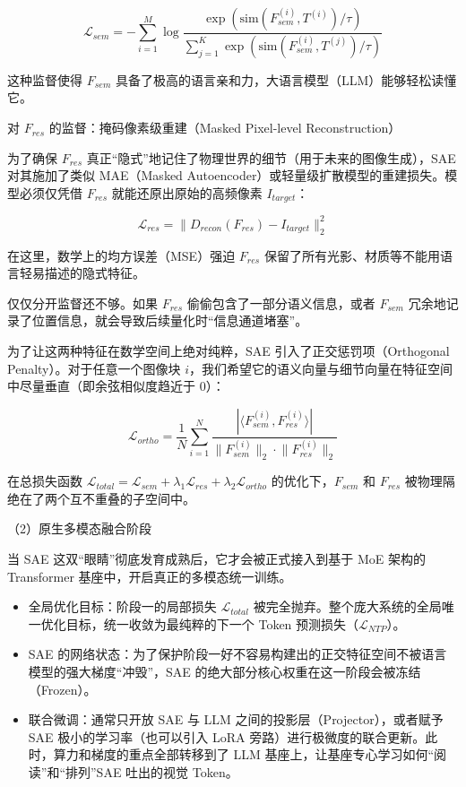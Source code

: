 \[
\mathcal{L}_{sem}=-\sum_{i=1}^{M}\log
\frac{\exp(\mathrm{sim}(F_{sem}^{(i)},T^{(i)})/\tau)}
{\sum_{j=1}^{K}\exp(\mathrm{sim}(F_{sem}^{(i)},T^{(j)})/\tau)}
\]

这种监督使得 \(F_{sem}\) 具备了极高的语言亲和力，大语言模型（LLM）能够轻松读懂它。

对 \(F_{res}\) 的监督：掩码像素级重建（Masked Pixel-level Reconstruction）

为了确保 \(F_{res}\) 真正``隐式''地记住了物理世界的细节（用于未来的图像生成），SAE 对其施加了类似 MAE（Masked Autoencoder）或轻量级扩散模型的重建损失。模型必须仅凭借 \(F_{res}\) 就能还原出原始的高频像素 \(I_{target}\)：

\[
\mathcal{L}_{res}=\lVert D_{recon}(F_{res})-I_{target}\rVert_2^2
\]

在这里，数学上的均方误差（MSE）强迫 \(F_{res}\) 保留了所有光影、材质等不能用语言轻易描述的隐式特征。

仅仅分开监督还不够。如果 \(F_{res}\) 偷偷包含了一部分语义信息，或者 \(F_{sem}\) 冗余地记录了位置信息，就会导致后续量化时``信息通道堵塞''。

为了让这两种特征在数学空间上绝对纯粹，SAE 引入了正交惩罚项（Orthogonal Penalty）。对于任意一个图像块 \(i\)，我们希望它的语义向量与细节向量在特征空间中尽量垂直（即余弦相似度趋近于 0）：

\[
\mathcal{L}_{ortho}=\frac{1}{N}\sum_{i=1}^{N}
\frac{|\langle F_{sem}^{(i)},F_{res}^{(i)}\rangle|}
{\lVert F_{sem}^{(i)}\rVert_2\cdot \lVert F_{res}^{(i)}\rVert_2}
\]

在总损失函数 \(\mathcal{L}_{total}=\mathcal{L}_{sem}+\lambda_1\mathcal{L}_{res}+\lambda_2\mathcal{L}_{ortho}\) 的优化下，\(F_{sem}\) 和 \(F_{res}\) 被物理隔绝在了两个互不重叠的子空间中。

（2）原生多模态融合阶段

当 SAE 这双``眼睛''彻底发育成熟后，它才会被正式接入到基于 MoE 架构的 Transformer 基座中，开启真正的多模态统一训练。

\begin{itemize}
\tightlist
\item
  全局优化目标：阶段一的局部损失 \(\mathcal{L}_{total}\) 被完全抛弃。整个庞大系统的全局唯一优化目标，统一收敛为最纯粹的下一个 Token 预测损失（\(\mathcal{L}_{NTP}\)）。
\item
  SAE 的网络状态：为了保护阶段一好不容易构建出的正交特征空间不被语言模型的强大梯度``冲毁''，SAE 的绝大部分核心权重在这一阶段会被冻结（Frozen）。
\item
  联合微调：通常只开放 SAE 与 LLM 之间的投影层（Projector），或者赋予 SAE 极小的学习率（也可以引入 LoRA 旁路）进行极微度的联合更新。此时，算力和梯度的重点全部转移到了 LLM 基座上，让基座专心学习如何``阅读''和``排列''SAE 吐出的视觉 Token。
\end{itemize}

